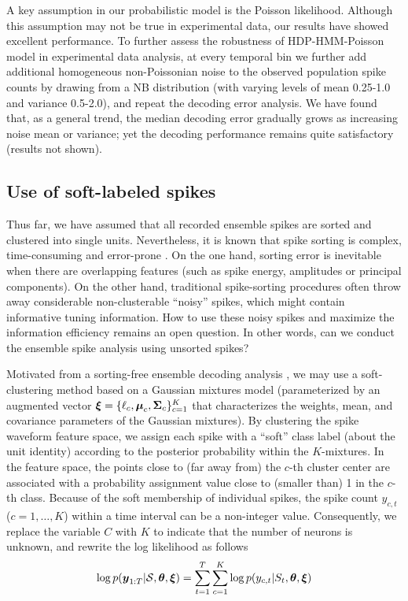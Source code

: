 A key assumption in our probabilistic model is the Poisson likelihood. Although this assumption may not be true in experimental data, our results have showed excellent performance.   
To further assess the robustness of HDP-HMM-Poisson model in experimental data analysis,
at every  temporal bin we  further add additional  homogeneous non-Poissonian noise  to the observed population spike counts by drawing from a NB distribution (with varying levels of mean 0.25-1.0 and variance 0.5-2.0), and repeat the decoding error analysis. We have found that, as a general trend,  the median decoding error gradually grows as increasing noise mean or variance; yet the decoding performance remains quite satisfactory (results not shown). 



\subsection{Use of soft-labeled spikes}


Thus far, we have assumed that all recorded ensemble spikes are sorted and clustered into single units. Nevertheless, it is known that spike sorting is complex, time-consuming and error-prone \citep{Wood08,Shalchyan14}.
On the one hand,  sorting error is inevitable when there are   overlapping features (such as spike energy, amplitudes or principal components).
On the other hand,  traditional spike-sorting procedures often throw away considerable non-clusterable ``noisy'' spikes, which might contain informative tuning information. How to use these noisy spikes and maximize the information efficiency remains an open question. 
In other words, can we conduct the ensemble spike analysis using unsorted spikes?


Motivated from a sorting-free ensemble decoding analysis \citep{Chen12b,Kloosterman14}, we may use a soft-clustering method based on a Gaussian mixtures model (parameterized by an augmented   vector $\boldsymbol{\xi}=\{\ell_c,\boldsymbol{\mu}_c,\boldsymbol{\Sigma}_c\}_{c=1}^K$  that characterizes the weights, mean, and covariance parameters of the Gaussian mixtures). By clustering the spike waveform feature space, we assign each spike with a ``soft'' class label (about the unit identity) according to the posterior probability within the $K$-mixtures. In the feature space, the points close to (far away from) the $c$-th cluster center are associated with a probability assignment value close to (smaller than) 1 in the $c$-th class. Because of the soft membership of individual spikes, the spike count $y_{c,t}$ ($c = 1,\dots, K$) within a time interval can be a non-integer value. Consequently, we replace the variable $C$ with $K$ to indicate that the number of neurons is unknown, and rewrite the  log likelihood as follows   
\begin{eqnarray}                                   
\log p({\boldsymbol{y}}_{1:T}|\mathcal{S},\boldsymbol{\theta},\boldsymbol{\xi})= \sum_{t=1}^T \sum_{c=1}^K \log p(y_{c,t}|S_t,\boldsymbol{\theta},\boldsymbol{\xi})
\end{eqnarray}

